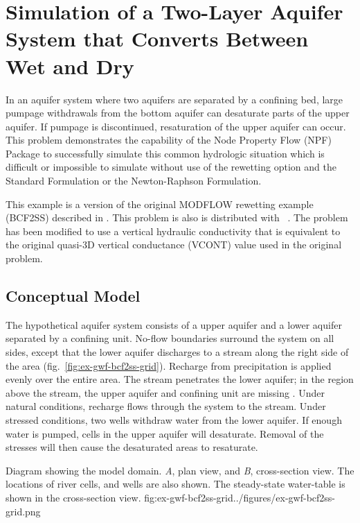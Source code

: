 \section{Simulation of a Two-Layer Aquifer System that Converts Between Wet and Dry}

In an aquifer system where two aquifers are separated by a confining bed, large pumpage withdrawals from the bottom aquifer can desaturate parts of the upper aquifer. If pumpage is discontinued, resaturation of the upper aquifer can occur. This problem demonstrates the capability of the Node Property Flow (NPF) Package to successfully simulate this common hydrologic situation which is difficult or impossible to simulate without use of the rewetting option and the Standard Formulation or the Newton-Raphson Formulation.

This example is a version of the original MODFLOW rewetting example (BCF2SS) described in \cite{mcdonaldetal1991wetdry}. This problem is also is distributed with \mff~\citep{modflow2005}. The problem has been modified to use a vertical hydraulic conductivity that is equivalent to the original quasi-3D vertical conductance (VCONT) value used in the original problem.


\subsection{Conceptual Model}

The hypothetical aquifer system consists of a upper aquifer and a lower aquifer separated by a confining unit. No-flow boundaries surround the system on all sides, except that the lower aquifer discharges to a stream along the right side of the area (fig.~\ref{fig:ex-gwf-bcf2ss-grid}). Recharge from precipitation is applied evenly over the entire area. The stream penetrates the lower aquifer; in the region above the stream, the upper aquifer and confining unit are missing  \cite[see][figure~1]{mcdonaldetal1991wetdry}. Under natural conditions, recharge flows through the system to the stream. Under stressed conditions, two wells withdraw water from the lower aquifer. If enough water is pumped, cells in the upper aquifer will desaturate. Removal of the stresses will then cause the desaturated areas to resaturate.


\begin{StandardFigure}{
                                     Diagram showing the model domain. \textit{A}, plan view, and \textit{B}, cross-section 
                                     view. The locations of river cells, and wells are also shown. The steady-state water-table
                                     is shown in the cross-section view.
                                     }{fig:ex-gwf-bcf2ss-grid}{../figures/ex-gwf-bcf2ss-grid.png}
\end{StandardFigure}                                 

